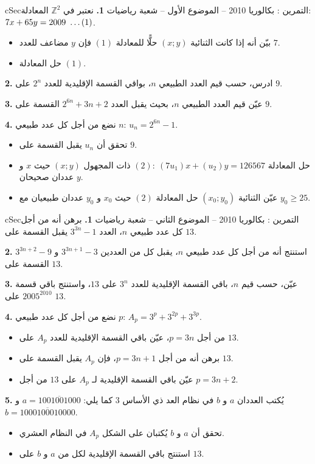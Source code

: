 \documentclass[12pt,a4paper]{article}
\newenvironment{BOX}[2]{\begin{otherlanguage}{english}\begin{arbox}{#1}{#2}}{\end{arbox}\end{otherlanguage}}
\newcounter{exo}
\newenvironment{tamrin}[1]{\stepcounter{exo}\begin{BOX}{cSec}{التمرين \theexo: #1}}{\end{BOX}}
\renewcommand{\ldots}{\mathinner{\ldotp\ldotp\ldotp}}
\newcommand{\Z}{\mathbb{Z}}
\newenvironment{sq}{\begin{itemize}[leftmargin=2.4em,itemsep=3pt]}{\end{itemize}}
\newcommand{\qa}{\item[(أ)]}\newcommand{\qb}{\item[(ب)]}\newcommand{\qc}{\item[(جـ)]}\newcommand{\qd}{\item[(د)]}\newcommand{\qe}{\item[(هـ)]}
\begin{document}
\begin{tamrin}{بكالوريا 2010 -- الموضوع الأول -- شعبة رياضيات}
\textbf{1.} نعتبر في $\Z^2$ المعادلة: $7x+65y=2009\ \ldots(1)$.
\begin{sq}
\qa بيّن أنه إذا كانت الثنائية $(x;y)$ حلًّا للمعادلة $(1)$ فإن $y$ مضاعف للعدد $7$.
\qb حل المعادلة $(1)$.
\end{sq}
\textbf{2.} ادرس، حسب قيم العدد الطبيعي $n$، بواقي القسمة الإقليدية للعدد $2^n$ على $9$.

\textbf{3.} عيّن قيم العدد الطبيعي $n$، بحيث يقبل العدد $2^{6n}+3n+2$ القسمة على $9$.

\textbf{4.} نضع من أجل كل عدد طبيعي $n$: $u_n=2^{6n}-1$.
\begin{sq}
\qa تحقق أن $u_n$ يقبل القسمة على $9$.
\qb حل المعادلة $(2):\ (7u_1)x+(u_2)y=126567$ ذات المجهول $(x;y)$ حيث $x$ و $y$ عددان صحيحان.
\qc عيّن الثنائية $(x_0;y_0)$ حل المعادلة $(2)$ حيث $x_0$ و $y_0$ عددان طبيعيان مع $y_0\ge25$.
\end{sq}
\end{tamrin}

\begin{tamrin}{بكالوريا 2010 -- الموضوع الثاني -- شعبة رياضيات}
\textbf{1.} برهن أنه من أجل كل عدد طبيعي $n$، العدد $3^{3n}-1$ يقبل القسمة على $13$.

\textbf{2.} استنتج أنه من أجل كل عدد طبيعي $n$، يقبل كل من العددين $3^{3n+1}-3$ و $3^{3n+2}-9$ القسمة على $13$.

\textbf{3.} عيّن، حسب قيم $n$، باقي القسمة الإقليدية للعدد $3^n$ على $13$، واستنتج باقي قسمة $2005^{2010}$ على $13$.

\textbf{4.} نضع من أجل كل عدد طبيعي $p$: $A_p=3^p+3^{2p}+3^{3p}$.
\begin{sq}
\qa من أجل $p=3n$، عيّن باقي القسمة الإقليدية للعدد $A_p$ على $13$.
\qb برهن أنه من أجل $p=3n+1$، فإن $A_p$ يقبل القسمة على $13$.
\qc عيّن باقي القسمة الإقليدية لـ $A_p$ على $13$ من أجل $p=3n+2$.
\end{sq}
\textbf{5.} يُكتب العددان $a$ و $b$ في نظام العد ذي الأساس $3$ كما يلي: $a=\overline{1001001000}$ و $b=\overline{1000100010000}$.
\begin{sq}
\qa تحقق أن $a$ و $b$ يُكتبان على الشكل $A_p$ في النظام العشري.
\qb استنتج باقي القسمة الإقليدية لكل من $a$ و $b$ على $13$.
\end{sq}
\end{tamrin}
\end{document}
